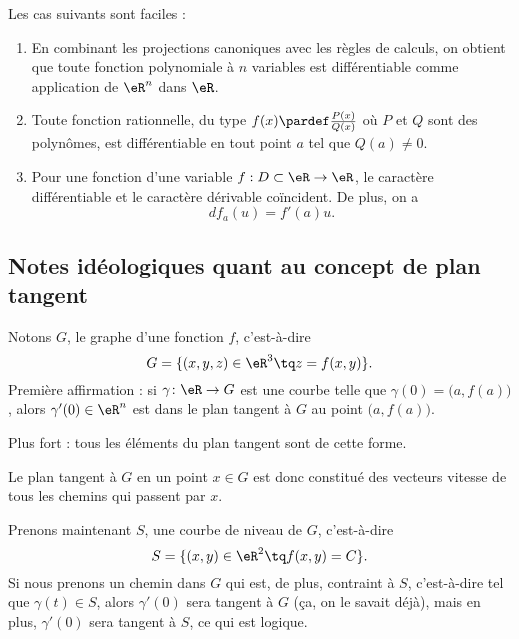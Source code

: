 \begin{example}
	Les cas suivants sont faciles :
	\begin{enumerate}
		\item En combinant les projections canoniques avec les règles de
		      calculs, on obtient que toute fonction polynomiale à $n$ variables
		      est différentiable comme application de $\eR^n$ dans $\eR$.

		\item Toute fonction rationnelle, du type $f(x) \pardef
			      \frac{P(x)}{Q(x)}$ où $P$ et $Q$ sont des polynômes, est
		      différentiable en tout point $a$ tel que $Q(a) \neq 0$.

		\item Pour une fonction d'une variable $f : D \subset \eR \to
			      \eR$, le caractère différentiable et le caractère dérivable
		      coïncident. De plus, on a
		      \begin{equation*}
			      d f_a(u) = f'(a) u.
		      \end{equation*}
	\end{enumerate}
\end{example}

\subsection{Notes idéologiques quant au concept de plan tangent}
\label{ssecConceptPlanTag}

Notons $G$, le graphe d'une fonction $f$, c'est-à-dire
\begin{equation}
	G=\{ (x,y,z)\in\eR^3\tq z=f(x,y) \}.
\end{equation}
Première affirmation : si $\gamma\colon \eR\to G$ est une courbe telle que $\gamma(0)=\big( a,f(a) \big)$, alors $\gamma'(0)\in\eR^n$ est dans le plan tangent à $G$ au point $\big( a,f(a) \big)$.

Plus fort : tous les éléments du plan tangent sont de cette forme.

Le plan tangent à $G$ en un point $x\in G$ est donc constitué des vecteurs vitesse de tous les chemins qui passent par $x$.

Prenons maintenant $S$, une courbe de niveau de $G$, c'est-à-dire
\begin{equation}
	S=\{ (x,y)\in\eR^2\tq f(x,y)=C \}.
\end{equation}
Si nous prenons un chemin dans $G$ qui est, de plus, contraint à $S$, c'est-à-dire tel que $\gamma(t)\in S$, alors $\gamma'(0)$ sera tangent à $G$ (ça, on le savait déjà), mais en plus, $\gamma'(0)$ sera tangent à $S$, ce qui est logique.

